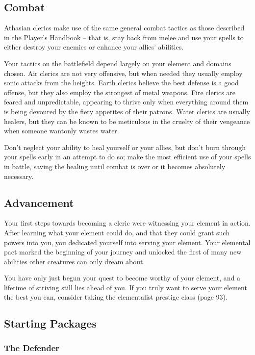 \subsection{Combat}

Athasian clerics make use of the same general combat tactics as those described in the Player's Handbook -- that is, stay back from melee and use your spells to either destroy your enemies or enhance your allies' abilities.

Your tactics on the battlefield depend largely on your element and domains chosen. Air clerics are not very offensive, but when needed they usually employ sonic attacks from the heights. Earth clerics believe the best defense is a good offense, but they also employ the strongest of metal weapons. Fire clerics are feared and unpredictable, appearing to thrive only when everything around them is being devoured by the fiery appetites of their patrons. Water clerics are usually healers, but they can be known to be meticulous in the cruelty of their vengeance when someone wantonly wastes water.

Don't neglect your ability to heal yourself or your allies, but don't burn through your spells early in an attempt to do so; make the most efficient use of your spells in battle, saving the healing until combat is over or it becomes absolutely necessary.

\subsection{Advancement}

Your first steps towards becoming a cleric were witnessing your element in action. After learning what your element could do, and that they could grant such powers into you, you dedicated yourself into serving your element. Your elemental pact marked the beginning of your journey and unlocked the first of many new abilities other creatures can only dream about.

You have only just begun your quest to become worthy of your element, and a lifetime of striving still lies ahead of you. If you truly want to serve your element the best you can, consider taking the elementalist prestige class (page 93).

\subsection{Starting Packages}
\subsubsection{The Defender}

